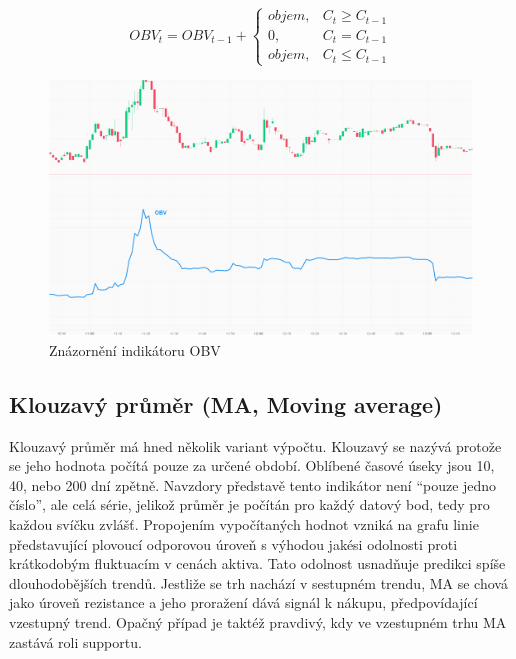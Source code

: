 \begin{equation}
    OBV_t = OBV_{t-1} +
    \begin{cases}
        objem, & C_t \ge C_{t-1} \\
        0,     & C_t = C_{t-1}   \\
        objem, & C_t \le C_{t-1}
    \end{cases}
    \label{eq:obv}
\end{equation}

\begin{figure}[h]
    \centering
    \includegraphics[width=1\textwidth]{Figures/OBV.pdf}
    \caption{Znázornění indikátoru OBV}
    \label{fig:obv}
\end{figure}

\subsection{Klouzavý průměr (MA, Moving average)}
Klouzavý průměr má hned několik variant výpočtu. Klouzavý se nazývá protože se jeho hodnota počítá pouze za určené období. Oblíbené časové úseky jsou 10, 40, nebo 200 dní zpětně.
Navzdory představě tento indikátor není \enquote{pouze jedno číslo}, ale celá série, jelikož průměr je počítán pro každý datový bod, tedy pro každou svíčku zvlášť. Propojením vypočítaných
hodnot vzniká na grafu linie představující plovoucí odporovou úroveň s výhodou jakési odolnosti proti krátkodobým fluktuacím v cenách aktiva. Tato odolnost usnadňuje predikci spíše dlouhodobějších trendů.
Jestliže se trh nachází v sestupném trendu, MA se chová jako úroveň rezistance a jeho proražení dává signál k nákupu, předpovídající vzestupný trend.
Opačný případ je taktéž pravdivý, kdy ve vzestupném trhu MA zastává roli supportu.

